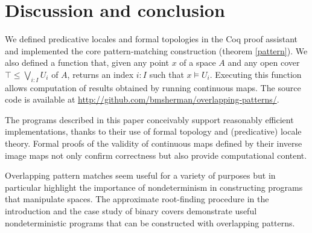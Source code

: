 \documentclass[conference]{IEEEtran}
\newcommand{\grammar}[1]{\textcolor{red}{\underline{#1}}}
\newcommand{\FutureWork}[1]{}
\begin{document}
\section{Discussion and conclusion}

We defined predicative locales and formal topologies in the Coq proof assistant and implemented the core pattern-matching construction (theorem \ref{pattern}). We also defined a function that, given any point $x$ of a space $A$ and any open cover $\top \le \bigvee_{i : I} U_i$ of $A$, returns an index $i : I$ such that $x \models U_i$. Executing this function allows computation of results obtained by running continuous maps. The source code is available at \url{http://github.com/bmsherman/overlapping-patterns/}.

The programs described in this paper conceivably support reasonably efficient implementations, thanks to their use of formal topology and (predicative) locale theory. Formal proofs of the validity of continuous maps defined by their inverse image maps not only confirm correctness but also provide computational content.

Overlapping pattern matches seem useful for a variety of purposes but in particular highlight the  importance of nondeterminism in constructing programs that manipulate spaces. The approximate root-finding procedure in the introduction and the case study of binary covers demonstrate useful nondeterministic programs that can be constructed with overlapping patterns.


\FutureWork{A possible direction of future work would be to extend overlapping patterns to the gros topos $\mathcal{E}$ over \textbf{FSpc} with the previously described open cover topology. For instance, we might want to have an overlapping pattern match that nondeterministically returns a \emph{function}, rather than simply a point of a space. Since \textbf{Spc} and \textbf{FSpc} lack exponentials in general, making sense of \grammar{this} would require extending the constructs defined here to $\mathcal{E}$.}




\end{document}
